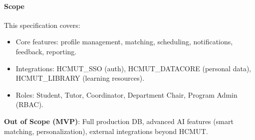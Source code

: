 \paragraph{Scope} This specification covers:
\begin{itemize}
  \item Core features: profile management, matching, scheduling, notifications, feedback, reporting.
  \item Integrations: HCMUT\_SSO (auth), HCMUT\_DATACORE (personal data), HCMUT\_LIBRARY (learning resources).
  \item Roles: Student, Tutor, Coordinator, Department Chair, Program Admin (RBAC).
\end{itemize}
\textbf{Out of Scope (MVP)}: Full production DB, advanced AI features (smart matching, personalization), external integrations beyond HCMUT.
